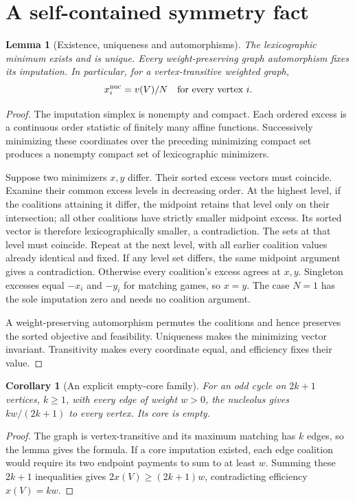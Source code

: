 \documentclass[11pt,a4paper]{article}
\newtheorem{lemma}[theorem]{Lemma}
\newtheorem{corollary}[theorem]{Corollary}
\theoremstyle{definition}
\theoremstyle{remark}
\begin{document}
\section{A self-contained symmetry fact}
\begin{lemma}[Existence, uniqueness and automorphisms]
The lexicographic minimum exists and is unique. Every weight-preserving graph automorphism fixes its imputation. In particular, for a vertex-transitive weighted graph,
\[
 x_i^{\rm nuc}=v(V)/N\quad\hbox{for every vertex }i.
\]
\end{lemma}
\begin{proof}
The imputation simplex is nonempty and compact. Each ordered excess is a continuous order statistic of finitely many affine functions. Successively minimizing these coordinates over the preceding minimizing compact set produces a nonempty compact set of lexicographic minimizers.

Suppose two minimizers $x,y$ differ. Their sorted excess vectors must coincide. Examine their common excess levels in decreasing order. At the highest level, if the coalitions attaining it differ, the midpoint retains that level only on their intersection; all other coalitions have strictly smaller midpoint excess. Its sorted vector is therefore lexicographically smaller, a contradiction. The sets at that level must coincide. Repeat at the next level, with all earlier coalition values already identical and fixed. If any level set differs, the same midpoint argument gives a contradiction. Otherwise every coalition's excess agrees at $x,y$. Singleton excesses equal $-x_i$ and $-y_i$ for matching games, so $x=y$. The case $N=1$ has the sole imputation zero and needs no coalition argument.

A weight-preserving automorphism permutes the coalitions and hence preserves the sorted objective and feasibility. Uniqueness makes the minimizing vector invariant. Transitivity makes every coordinate equal, and efficiency fixes their value.
\end{proof}

\begin{corollary}[An explicit empty-core family]
For an odd cycle on $2k+1$ vertices, $k\geq1$, with every edge of weight $w>0$, the nucleolus gives $kw/(2k+1)$ to every vertex. Its core is empty.
\end{corollary}
\begin{proof}
The graph is vertex-transitive and its maximum matching has $k$ edges, so the lemma gives the formula. If a core imputation existed, each edge coalition would require its two endpoint payments to sum to at least $w$. Summing these $2k+1$ inequalities gives $2x(V)\geq(2k+1)w$, contradicting efficiency $x(V)=kw$.
\end{proof}
\end{document}
